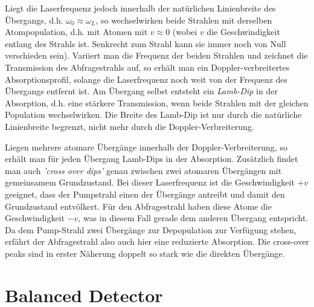 Liegt die Laserfrequenz jedoch innerhalb der natürlichen Linienbreite des Übergangs, d.h. $\omega_0 \approx \omega_L$, so wechselwirken beide Strahlen mit derselben Atompopulation, d.h. mit Atomen mit $v \approx 0$ (wobei $v$ die Geschwindigkeit entlang des Strahls ist. Senkrecht zum Strahl kann sie immer noch von Null verschieden sein). Variiert man die Frequenz der beiden Strahlen und zeichnet die Transmission des Abfragestrahls auf, so erhält man ein Doppler-verbreitertes Absorptionsprofil, solange die Laserfrequenz noch weit von der Frequenz des Übergangs entfernt ist. Am Übergang selbst entsteht ein \emph{Lamb-Dip} in der Absorption, d.h. eine stärkere Transmission, wenn beide Strahlen mit der gleichen Population wechselwirken. Die Breite des Lamb-Dip ist nur durch die natürliche Linienbreite begrenzt, nicht mehr durch die Doppler-Verbreiterung.



Liegen mehrere atomare Übergänge innerhalb der Doppler-Verbreiterung, so erhält man für jeden Übergang Lamb-Dips in der Absorption. Zusätzlich findet man auch \emph{'cross over dips'} genau zwischen zwei atomaren Übergängen mit gemeinsamem Grundzustand. Bei dieser Laserfrequenz ist die Geschwindigkeit $+v$ geeignet, dass der Pumpstrahl einen der Übergänge antreibt und damit den Grundzustand entvölkert. Für den Abfragestrahl haben diese Atome die Geschwindigkeit $-v$, was in diesem Fall gerade dem anderen Übergang entspricht. Da dem Pump-Strahl zwei Übergänge zur Depopulation zur Verfügung stehen, erfährt der  Abfragestrahl  also auch hier eine reduzierte Absorption. Die cross-over peaks sind in erster Näherung doppelt so stark wie die direkten Übergänge.


\begin{questions}
\end{questions}
	

\section{Balanced Detector}

